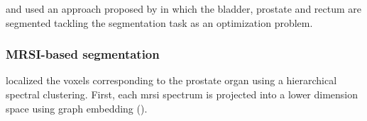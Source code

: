 \begin{enumerate}[leftmargin=*]
\cite{Litjens2011} and \cite{Vos2012} used an approach proposed by \cite{Huisman2010} in which the bladder, prostate and rectum are segmented tackling the segmentation task as an optimization problem.%

\end{enumerate}

\subsubsection{MRSI-based segmentation}

\cite{Tiwari2009} localized the voxels corresponding to the prostate organ using a hierarchical spectral clustering. First, each \ac{mrsi} spectrum is projected into a lower dimension space using graph embedding (\cite{Shi2000}).%
%
%
%
